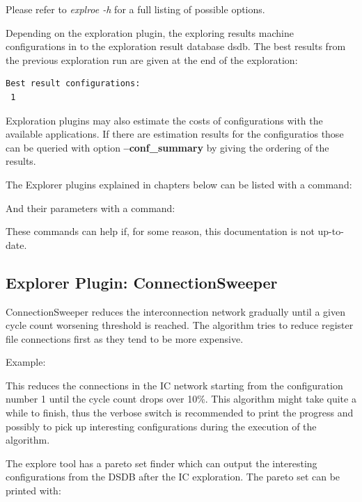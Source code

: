 \documentclass[twoside]{tceusermanual}
\begin{document}
Please refer to \textit{explroe -h} for a full listing of possible options.

Depending on the exploration plugin, the exploring results machine
configurations in to the exploration result database dsdb. The best results
from the previous exploration run are given at the end of the exploration:


\begin{verbatim}
Best result configurations:
 1
\end{verbatim}
Exploration plugins may also estimate the costs of configurations with the
available applications. If there are estimation results for the configuratios
those can be queried with option \textbf{--conf\_summary} by giving the
ordering of the results.

The Explorer plugins explained in chapters below can be listed with a command:


And their parameters with a command:


These commands can help if, for some reason, this documentation is not up-to-date.

\subsection{Explorer Plugin: ConnectionSweeper}
\label{ConnectionSweeper}
ConnectionSweeper reduces the interconnection network gradually until a
given cycle count worsening threshold is reached. The algorithm tries to
reduce register file connections first as they tend to be more expensive.

Example:


This reduces the connections in the IC network starting from the configuration 
number 1 until the cycle count drops over 10\%. This algorithm might take 
quite a while to finish, thus the verbose switch is recommended to print 
the progress and possibly to pick up interesting configurations during the 
execution of the algorithm.

The explore tool has a pareto set finder which can output the interesting
configurations from the DSDB after the IC exploration. The pareto set
can be printed with:
\end{document}
